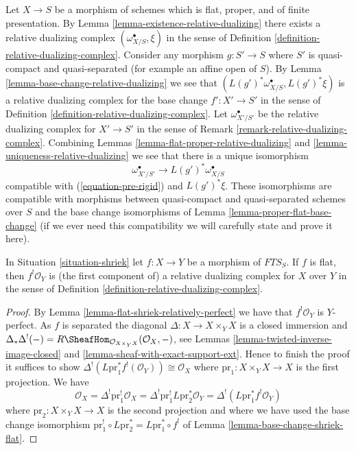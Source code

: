 \begin{remark}
\label{remark-relative-dualizing-complex-bis}
Let $X \to S$ be a morphism of schemes which is flat, proper, and
of finite presentation. By Lemma \ref{lemma-existence-relative-dualizing}
there exists a relative dualizing complex $(\omega_{X/S}^\bullet, \xi)$
in the sense of Definition \ref{definition-relative-dualizing-complex}.
Consider any morphism $g : S' \to S$ where $S'$ is quasi-compact and
quasi-separated (for example an affine open of $S$).
By Lemma \ref{lemma-base-change-relative-dualizing}
we see that $(L(g')^*\omega_{X/S}^\bullet, L(g')^*\xi)$ is
a relative dualizing complex for the base change $f' : X' \to S'$
in the sense of Definition \ref{definition-relative-dualizing-complex}.
Let $\omega_{X'/S'}^\bullet$ be the relative dualizing complex
for $X' \to S'$ in the sense of Remark \ref{remark-relative-dualizing-complex}.
Combining Lemmas \ref{lemma-flat-proper-relative-dualizing} and
\ref{lemma-uniqueness-relative-dualizing}
we see that there is a unique isomorphism
$$
\omega_{X'/S'}^\bullet \longrightarrow L(g')^*\omega_{X/S}^\bullet
$$
compatible with (\ref{equation-pre-rigid}) and $L(g')^*\xi$.
These isomorphisms are compatible with morphisms between
quasi-compact and quasi-separated schemes over $S$
and the base change isomorphisms of Lemma \ref{lemma-proper-flat-base-change}
(if we ever need this compatibility we will carefully state and prove
it here).
\end{remark}

\begin{lemma}
\label{lemma-compactifyable-relative-dualizing}
In Situation \ref{situation-shriek} let $f : X \to Y$
be a morphism of $\textit{FTS}_S$. If $f$ is flat, then
$f^!\mathcal{O}_Y$ is (the first component of)
a relative dualizing complex for $X$ over $Y$ in the sense of
Definition \ref{definition-relative-dualizing-complex}.
\end{lemma}

\begin{proof}
By Lemma \ref{lemma-flat-shriek-relatively-perfect}
we have that $f^!\mathcal{O}_Y$
is $Y$-perfect. As $f$ is separated the diagonal
$\Delta : X \to X \times_Y X$ is a closed immersion and
$\Delta_*\Delta^!(-) =
R\SheafHom_{\mathcal{O}_{X \times_Y X}}(\mathcal{O}_X, -)$, see
Lemmas
\ref{lemma-twisted-inverse-image-closed} and
\ref{lemma-sheaf-with-exact-support-ext}.
Hence to finish the proof it suffices to show
$\Delta^!(L\text{pr}_1^*f^!(\mathcal{O}_Y)) \cong \mathcal{O}_X$
where $\text{pr}_1 : X \times_Y X \to X$ is the first projection.
We have
$$
\mathcal{O}_X = \Delta^! \text{pr}_1^!\mathcal{O}_X =
\Delta^! \text{pr}_1^! L\text{pr}_2^*\mathcal{O}_Y =
\Delta^!(L\text{pr}_1^* f^!\mathcal{O}_Y)
$$
where $\text{pr}_2 : X \times_Y X \to X$ is the second projection
and where we have used the base change isomorphism
$\text{pr}_1^! \circ L\text{pr}_2^* = L\text{pr}_1^* \circ f^!$ of
Lemma \ref{lemma-base-change-shriek-flat}.
\end{proof}

